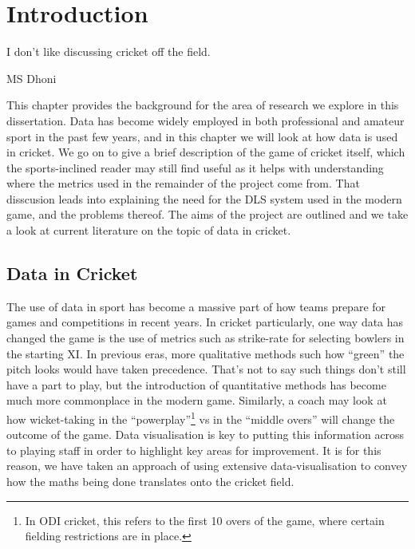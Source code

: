 \chapter{Introduction}

\epigraph{I don't like discussing cricket off the field.}{MS Dhoni}

This chapter provides the background for the area of research we explore in this dissertation. Data has become widely employed in both professional and amateur sport in the past few years, and 
in this chapter we will look at how data is used in cricket. We go on to give a brief description of the game of cricket itself, which the sports-inclined reader may 
still find useful as it helps with understanding where the metrics used in the remainder of the project come from. That disscusion leads into explaining the need for 
the DLS system used in the modern game, and the problems thereof. The aims of the project are outlined and we take a look at current literature on the topic of data in cricket. 

\section{Data in Cricket}
The use of data in sport has become a massive part of how teams prepare for games and competitions in recent years. In cricket particularly, one way data has changed the game is the use
of metrics such as strike-rate for selecting bowlers in the starting XI. In previous eras, more qualitative methods such how ``green'' the pitch looks would have taken precedence.
That's not to say such things don't still have a part to play, but the introduction of quantitative methods has become much more commonplace in the modern game.
Similarly, a coach may look at how wicket-taking in the ``powerplay''\footnote{In ODI cricket, this refers to the first 10 overs of the game, where certain fielding restrictions are in place.}
vs in the ``middle overs'' will change the outcome of the game. Data visualisation is key to putting this information across to playing staff in order to highlight key areas for
improvement. It is for this reason, we have taken an approach of using extensive data-visualisation to convey how the maths being done translates onto the cricket field. \\ 

